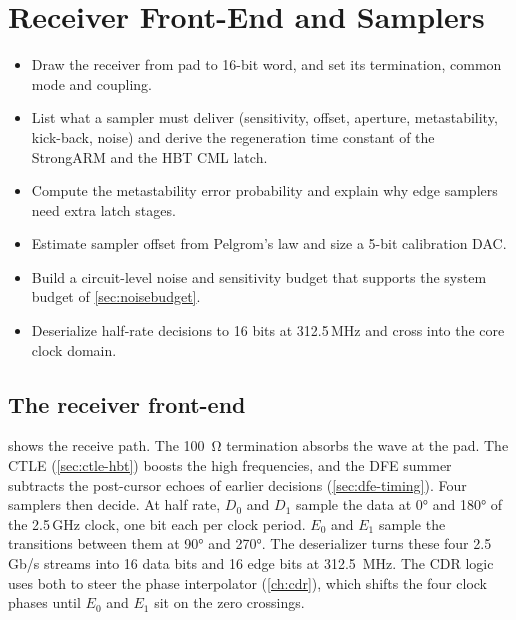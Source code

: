\chapter{Receiver Front-End and Samplers}\label{ch:rx}

\begin{objectives}
\begin{itemize}
  \item Draw the \OS{} receiver from pad to 16-bit word, and set its termination, common mode and coupling.
  \item List what a sampler must deliver (sensitivity, offset, aperture, metastability, kick-back, noise) and derive the regeneration time constant of the StrongARM and the HBT CML latch.
  \item Compute the metastability error probability and explain why edge samplers need extra latch stages.
  \item Estimate sampler offset from Pelgrom's law and size a 5-bit calibration DAC.
  \item Build a circuit-level noise and sensitivity budget that supports the system budget of \cref{sec:noisebudget}.
  \item Deserialize half-rate decisions to 16 bits at 312.5\,MHz and cross into the core clock domain.
\end{itemize}
\end{objectives}

\section{The receiver front-end}\label{sec:rx-frontend}

 shows the receive path. The \qty{100}{\ohm} termination absorbs the wave at the pad. The CTLE (\cref{sec:ctle-hbt}) boosts the high frequencies, and the DFE summer subtracts the post-cursor echoes of earlier decisions (\cref{sec:dfe-timing}). Four samplers then decide. At half rate, $D_0$ and $D_1$ sample the data at \ang{0} and \ang{180} of the 2.5\,GHz clock, one bit each per clock period. $E_0$ and $E_1$ sample the transitions between them at \ang{90} and \ang{270}. The deserializer turns these four 2.5\,Gb/s streams into 16 data bits and 16 edge bits at \qty{312.5}{\mega\hertz}. The CDR logic uses both to steer the phase interpolator (\cref{ch:cdr}), which shifts the four clock phases until $E_0$ and $E_1$ sit on the zero crossings.

